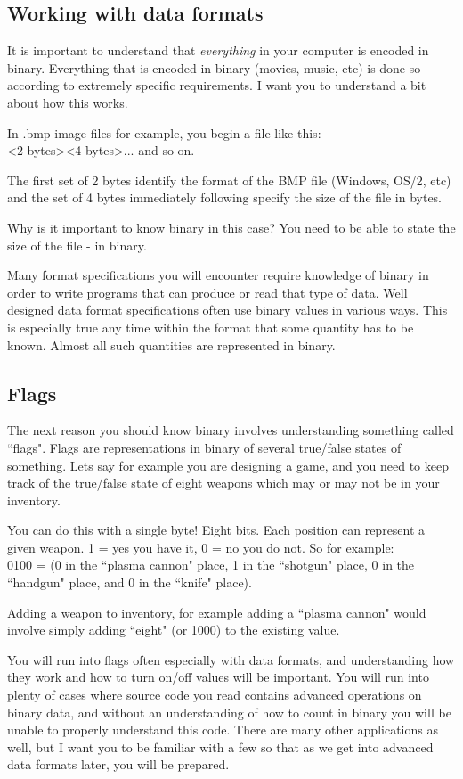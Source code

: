 \documentclass[a4paper,12pt]{article}
\begin{document}
\subsection{Working with data formats}
It is important to understand that \emph{everything} in your computer is encoded in binary. Everything that is encoded in binary (movies, music, etc) is done so according to extremely specific requirements. I want you to understand a bit about how this works.

In .bmp image files for example, you begin a file like this:
\\\textless2 bytes\textgreater \textless4 bytes\textgreater ... and so on.

The first set of 2 bytes identify the format of the BMP file (Windows, OS/2, etc) and the set of 4 bytes immediately following specify the size of the file in bytes.

Why is it important to know binary in this case? You need to be able to state the size of the file - in binary.

Many format specifications you will encounter require knowledge of binary in order to write programs that can produce or read that type of data. Well designed data format specifications often use binary values in various ways. This is especially true any time within the format that some quantity has to be known. Almost all such quantities are represented in binary.
\subsection{Flags}
The next reason you should know binary involves understanding something called ``flags". Flags are representations in binary of several true/false states of something. Lets say for example you are designing a game, and you need to keep track of the true/false state of eight weapons which may or may not be in your inventory.

You can do this with a single byte! Eight bits. Each position can represent a given weapon. 1 = yes you have it, 0 = no you do not. So for example:
\\0100 = (0 in the ``plasma cannon" place, 1 in the ``shotgun" place, 0 in the ``handgun" place, and 0 in the ``knife" place).

Adding a weapon to inventory, for example adding a ``plasma cannon" would involve simply adding ``eight" (or 1000) to the existing value.

You will run into flags often especially with data formats, and understanding how they work and how to turn on/off values will be important. You will run into plenty of cases where source code you read contains advanced operations on binary data, and without an understanding of how to count in binary you will be unable to properly understand this code.
There are many other applications as well, but I want you to be familiar with a few so that as we get into advanced data formats later, you will be prepared.
\end{document}
